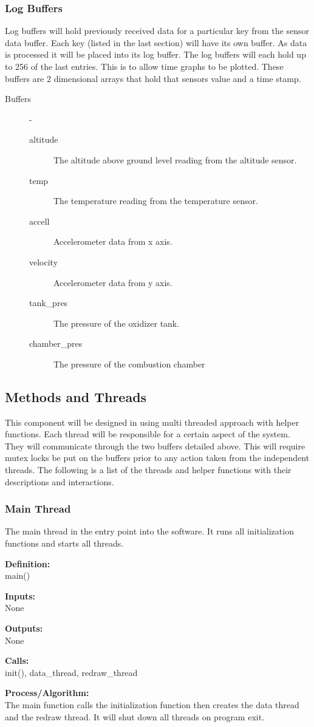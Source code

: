 \documentclass[10pt,draftclsnofoot,onecolumn,compsoc]{IEEEtran}
\begin{document}
\subsubsection{Log Buffers}
Log buffers will hold previously received data for a particular key from the sensor data buffer. Each key (listed in the last section) will have its own buffer. As data is processed it will be placed into its log buffer. The log buffers will each hold up to 256 of the last entries. This is to allow time graphs to be plotted. These buffers are 2 dimensional arrays that hold that sensors value and a time stamp.
\begin{description}
	\item[Buffers]  -
		\begin{description}
			\item[altitude] The altitude above ground level reading from the altitude sensor.
			\item[temp] The temperature reading from the temperature sensor.
			\item[accell] Accelerometer data from x axis.
			\item[velocity] Accelerometer data from y axis.
			\item[tank\_pres] The pressure of the oxidizer tank.
			\item[chamber\_pres] The pressure of the combustion chamber
		\end{description}
\end{description}
\subsection{Methods and Threads}
This component will be designed in using multi threaded approach with helper functions. Each thread will be responsible for a certain aspect of the system. They will communicate through the two buffers detailed above. This will require mutex locks be put on the buffers prior to any action taken from the independent threads. The following is a list of the threads and helper functions with their descriptions and interactions.
\subsubsection{Main Thread}
The main thread in the entry point into the software. It runs all initialization functions and starts all threads. \par
{\bf Definition:} \\ 
main() \par
{\bf Inputs:} \\  None \par
{\bf Outputs:} \\ None \par
{\bf Calls:} \\ init(), data\_thread, redraw\_thread \par
{\bf Process/Algorithm:} \\
The main function calls the initialization function then creates the data thread and the redraw thread. It will shut down all threads on program exit. \par
\end{document}
